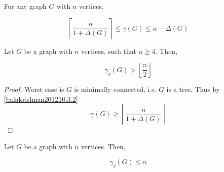 \begin{theorem} [Balakrishnan 2012 10.3.2] \label{balakrishnan201210.3.2}
    For any graph $G$ with $n$ vertices, 
    
    \[ \left\lceil {\frac{n}{1+\Delta(G)}} \right\rceil \leq \gamma(G) \leq n - \Delta(G)\]    \cite{balakrishnan2012}
    
\end{theorem}

\begin{theorem} \label{minDomSize}
    Let $G$ be a graph with $n$ vertices, such that $n \geq 4$. Then,
    
    \[ \gamma_g(G) > \left \lfloor{\frac{n}{2}}\right \rfloor \]
    
\end{theorem}

\begin{proof}
Worst case is $G$ is minimally connected, i.e. $G$ is a tree. Thus by \ref{balakrishnan201210.3.2} 
\[\gamma(G) \geq \left\lceil {\frac{n}{1+\Delta(G)}} \right\rceil\]       
\end{proof}

\begin{theorem}
    Let $G$ be a graph with $n$ vertices. Then,
    
    \[ \gamma_g(G) \leq n\]
\end{theorem}
